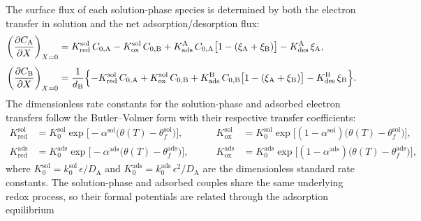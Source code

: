 The surface flux of each solution-phase species is determined by both
the electron transfer in solution and the net adsorption/desorption
flux:
\begin{equation}\label{eq:ads-bc}
  \begin{aligned}
    \left(\frac{\partial C_\mathrm{A}}{\partial X}\right)_{X=0}
    &= K_{\mathrm{red}}^{\mathrm{sol}}\,C_{0,\mathrm{A}}
    - K_{\mathrm{ox}}^{\mathrm{sol}}\,C_{0,\mathrm{B}}
    + K_{\mathrm{ads}}^{\mathrm{A}}\,C_{0,\mathrm{A}}
    \bigl[1 - (\xi_\mathrm{A} + \xi_\mathrm{B})\bigr]
    - K_{\mathrm{des}}^{\mathrm{A}}\,\xi_\mathrm{A}, \\[4pt]
    \left(\frac{\partial C_\mathrm{B}}{\partial X}\right)_{X=0}
    &= \frac{1}{d_\mathrm{B}}\Bigl\{
      -K_{\mathrm{red}}^{\mathrm{sol}}\,C_{0,\mathrm{A}}
      + K_{\mathrm{ox}}^{\mathrm{sol}}\,C_{0,\mathrm{B}}
      + K_{\mathrm{ads}}^{\mathrm{B}}\,C_{0,\mathrm{B}}
      \bigl[1 - (\xi_\mathrm{A} + \xi_\mathrm{B})\bigr]
      - K_{\mathrm{des}}^{\mathrm{B}}\,\xi_\mathrm{B}
    \Bigr\}.
  \end{aligned}
\end{equation}
The dimensionless rate constants for the solution-phase and adsorbed
electron transfers follow the Butler--Volmer form with their respective
transfer coefficients:
\begin{equation}\label{eq:ads-kred-kox}
  \begin{aligned}
    K_{\mathrm{red}}^{\mathrm{sol}}
    &= K_0^{\mathrm{sol}}
    \exp\!\bigl[-\alpha^{\mathrm{sol}}\bigl(\theta(T) -
    \theta_f^{\mathrm{sol}}\bigr)\bigr],
    &\qquad
    K_{\mathrm{ox}}^{\mathrm{sol}}
    &= K_0^{\mathrm{sol}}
    \exp\!\bigl[(1-\alpha^{\mathrm{sol}})\bigl(\theta(T) -
    \theta_f^{\mathrm{sol}}\bigr)\bigr],
    \\[4pt]
    K_{\mathrm{red}}^{\mathrm{ads}}
    &= K_0^{\mathrm{ads}}
    \exp\!\bigl[-\alpha^{\mathrm{ads}}\bigl(\theta(T) -
    \theta_f^{\mathrm{ads}}\bigr)\bigr],
    &\qquad
    K_{\mathrm{ox}}^{\mathrm{ads}}
    &= K_0^{\mathrm{ads}}
    \exp\!\bigl[(1-\alpha^{\mathrm{ads}})\bigl(\theta(T) -
    \theta_f^{\mathrm{ads}}\bigr)\bigr],
  \end{aligned}
\end{equation}
where $K_0^{\mathrm{sol}} = k_0^{\mathrm{sol}}\,\epsilon / D_\mathrm{A}$
and $K_0^{\mathrm{ads}} = k_0^{\mathrm{ads}}\,\epsilon^2 / D_\mathrm{A}$
are the dimensionless standard rate constants. The solution-phase and
adsorbed couples share the same underlying redox process, so their
formal potentials are related through the adsorption equilibrium
